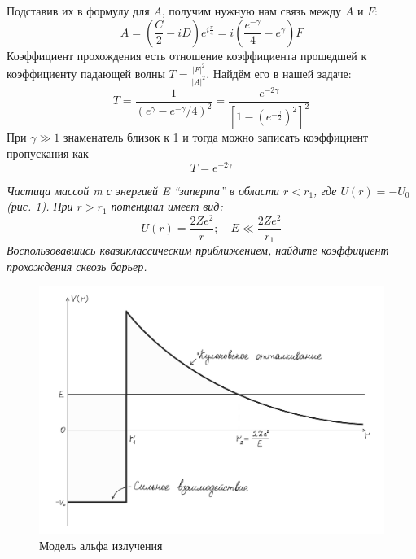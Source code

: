 Подставив их в формулу для $A$, получим нужную нам связь между $A$ и $F$:
\[
A = \left( \frac{C}{2} - iD \right)e^{i\frac{\pi}{4}} = i\left( \frac{e^{-\gamma}}{4} - e^{\gamma} \right)F
\]
Коэффициент прохождения есть отношение коэффициента прошедшей к коэффициенту падающей волны $T = \frac{|F|^2}{|A|^2}$. Найдём его в нашей задаче:
\[
T = \frac{1}{(e^{\gamma} - e^{-\gamma}/4)^2} = \frac{e^{-2\gamma}}{[1-(e^{-\frac{\gamma}{2}})^2]^2}
\]
При $\gamma \gg 1$ знаменатель близок к 1 и тогда можно записать коэффициент пропускания как
\[
T = e^{-2\gamma}
\]

\begin{center}
\textit{Частица массой m с энергией E ``заперта'' в области $r<r_1$, где $U(r) = -U_0$ (рис. \ref{fig C.3}).  При $r > r_1$ потенциал имеет вид:}
\[
U(r) = \frac{2Ze^2}{r}; \quad E \ll \frac{2Ze^2}{r_1}
\]
\textit{Воспользовавшись квазиклассическим приближением, найдите коэффициент прохождения сквозь барьер.}
\end{center}

\begin{figure}[h!]
\centering
\includegraphics[scale=0.2]{appendix/images/alpha-decay.jpg}
\caption{Модель альфа излучения}
\label{fig C.3}
\end{figure}


